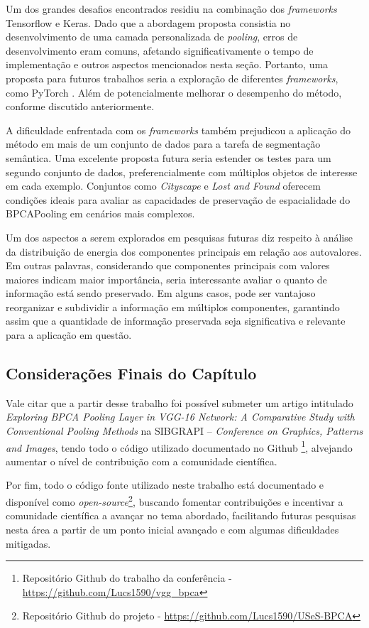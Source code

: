 Um dos grandes desafios encontrados residiu na combinação dos \textit{frameworks} Tensorflow e Keras. Dado que a abordagem proposta consistia no desenvolvimento de uma camada personalizada de \textit{pooling}, erros de desenvolvimento eram comuns, afetando significativamente o tempo de implementação e outros aspectos mencionados nesta seção. Portanto, uma proposta para futuros trabalhos seria a exploração de diferentes \textit{frameworks}, como PyTorch \citep{Paszke2017AutomaticPyTorch}. Além de potencialmente melhorar o desempenho do método, conforme discutido anteriormente.

A dificuldade enfrentada com os \textit{frameworks} também prejudicou a aplicação do método em mais de um conjunto de dados para a tarefa de segmentação semântica. Uma excelente proposta futura seria estender os testes para um segundo conjunto de dados, preferencialmente com múltiplos objetos de interesse em cada exemplo. Conjuntos como \textit{Cityscape} \citep{Cordts2016} e \textit{Lost and Found} \citep{Pinggera2016LostVehicles} oferecem condições ideais para avaliar as capacidades de preservação de espacialidade do BPCAPooling em cenários mais complexos.

Um dos aspectos a serem explorados em pesquisas futuras diz respeito à análise da distribuição de energia dos componentes principais em relação aos autovalores. Em outras palavras, considerando que componentes principais com valores maiores indicam maior importância, seria interessante avaliar o quanto de informação está sendo preservado. Em alguns casos, pode ser vantajoso reorganizar e subdividir a informação em múltiplos componentes, garantindo assim que a quantidade de informação preservada seja significativa e relevante para a aplicação em questão.


\subsection{Considerações Finais do Capítulo}
\label{conclusion:final}
Vale citar que a partir desse trabalho foi possível submeter um artigo intitulado \textit{Exploring BPCA Pooling Layer in VGG-16 Network: A Comparative Study with Conventional Pooling Methods} na SIBGRAPI – \textit{Conference on Graphics, Patterns and Images}, tendo todo o código utilizado documentado no Github \footnote{Repositório Github do trabalho da conferência - \url{https://github.com/Lucs1590/vgg_bpca}}, alvejando aumentar o nível de contribuição com a comunidade científica.

Por fim, todo o código fonte utilizado neste trabalho está documentado e disponível como \textit{open-source}\footnote{Repositório Github do projeto - \url{https://github.com/Lucs1590/USeS-BPCA}}, buscando fomentar contribuições e incentivar a comunidade científica a avançar no tema abordado, facilitando futuras pesquisas nesta área a partir de um ponto inicial avançado e com algumas dificuldades mitigadas.
